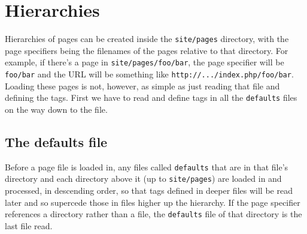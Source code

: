 \section{Hierarchies}
Hierarchies of pages can be created inside the \texttt{site/pages} directory, with the page specifiers being
the filenames of the pages relative to that directory.
For example, if there's a page in \texttt{site/pages/foo/bar}, the page specifier
will be \texttt{foo/bar} and the URL will be something like \texttt{http://.../index.php/foo/bar}.
Loading these pages is not, however, as simple as just reading that file and defining the tags. First
we have to read and define tags in all the \texttt{defaults} files on the way down to the file.

\subsection{The defaults file}
Before a page file is loaded in, any files called \texttt{defaults} that are in
that file's directory and each directory above it (up to \texttt{site/pages})
are loaded in and processed, in descending order, so that tags defined in
deeper files will be read later and so supercede those in files higher up the
hierarchy. If the page specifier references a directory rather than a file,
the \texttt{defaults} file of that directory is the last file read.

